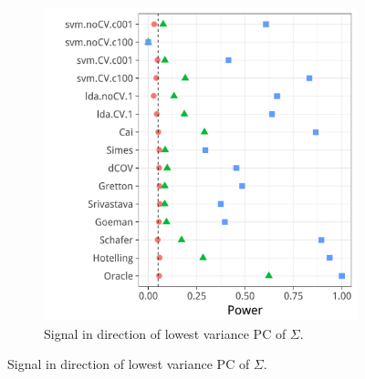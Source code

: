 \documentclass[journal]{IEEEtran}
\begin{document}
\begin{figure}[h]
\begin{subfigure}[t]{.45\columnwidth}
		\includegraphics[width=1\columnwidth]{"art/file21"}
		\caption{Signal in direction of lowest variance PC of $\Sigma$.} 
		\label{fig:dependence_12}
	\end{subfigure}
\end{figure}
\end{document}
